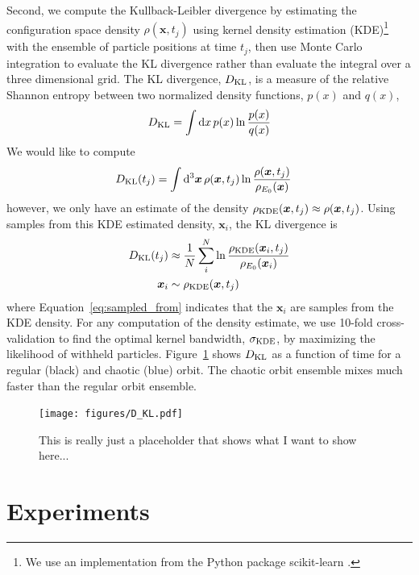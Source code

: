 \documentclass[letterpaper,12pt,preprint]{aastex}
\newcommand{\dd}{\mathrm{d}}
\newcommand{\bs}[1]{\boldsymbol{#1}}
\begin{document}
Second, we compute the Kullback-Leibler divergence \citep[KL divergence;][]{kullback51} by estimating the configuration space density $\rho(\bs{x},t_j)$ using kernel density estimation (KDE)\footnote{We use an implementation from the Python package scikit-learn \citep{scikitlearn}.} with the ensemble of particle positions at time $t_j$, then use Monte Carlo integration to evaluate the KL divergence rather than evaluate the integral over a three dimensional grid. The KL divergence, $D_{\rm KL}$, is a measure of the relative Shannon entropy between two normalized density functions, $p(x)$ and $q(x)$,
\begin{equation}
	D_{\rm KL} = \int \dd x \, p(x) \ln \frac{p(x)}{q(x)}
\end{equation}
We would like to compute 
\begin{align}
	D_{\rm KL}(t_j) &= \int \dd^3 \bs{x} \, \rho(\bs{x},t_j) \ln \frac{\rho(\bs{x},t_j)}{\rho_{E_0}(\bs{x})}
\end{align}
however, we only have an estimate of the density $\rho_{\rm KDE}(\bs{x},t_j) \approx \rho(\bs{x},t_j)$. Using samples from this KDE estimated density, $\bs{x}_i$, the KL divergence is
\begin{align}
	D_{\rm KL}(t_j) &\approx \frac{1}{N} \sum_i^N \ln \frac{\rho_{\rm KDE}(\bs{x}_i,t_j)}{\rho_{E_0}(\bs{x}_i)}\\
	\bs{x}_i &\sim \rho_{\rm KDE}(\bs{x},t_j)\label{eq:sampled_from}
\end{align}
where Equation~\ref{eq:sampled_from} indicates that the $\bs{x}_i$ are samples from the KDE density. For any computation of the density estimate, we use 10-fold cross-validation to find the optimal kernel bandwidth, $\sigma_{\rm KDE}$, by maximizing the likelihood of withheld particles. Figure~\ref{fig:DKL} shows $D_{\rm KL}$ as a function of time for a regular (black) and chaotic (blue) orbit. The chaotic orbit ensemble mixes much faster than the regular orbit ensemble.

\begin{figure}[!h]
\begin{center}
\texttt{[image: figures/D\_KL.pdf]}
\caption{This is really just a placeholder that shows what I want to show here...} \label{fig:DKL}
\end{center}
\end{figure}

\section{Experiments}\label{sec:experiments}
\end{document}
